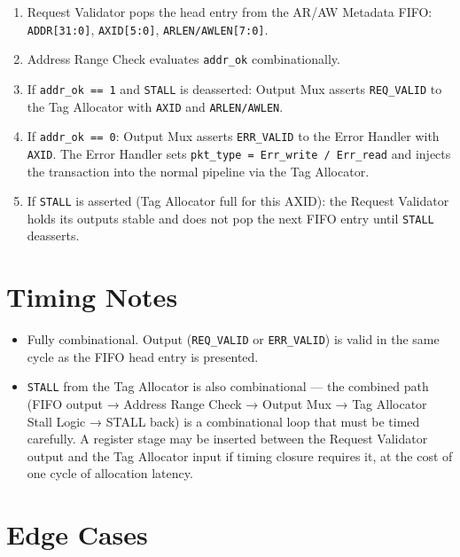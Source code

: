 \documentclass[11pt,a4paper]{article}
\begin{document}
\begin{enumerate}
  \item Request Validator pops the head entry from the AR/AW Metadata
        FIFO: \texttt{ADDR[31:0]}, \texttt{AXID[5:0]},
        \texttt{ARLEN/AWLEN[7:0]}.
  \item Address Range Check evaluates \texttt{addr\_ok} combinationally.
  \item If \texttt{addr\_ok == 1} and \texttt{STALL} is deasserted:
        Output Mux asserts \texttt{REQ\_VALID} to the Tag Allocator
        with \texttt{AXID} and \texttt{ARLEN/AWLEN}.
  \item If \texttt{addr\_ok == 0}: Output Mux asserts \texttt{ERR\_VALID}
        to the Error Handler with \texttt{AXID}. The Error Handler sets
        \texttt{pkt\_type = Err\_write / Err\_read} and injects the
        transaction into the normal pipeline via the Tag Allocator.
  \item If \texttt{STALL} is asserted (Tag Allocator full for this
        AXID): the Request Validator holds its outputs stable and does
        not pop the next FIFO entry until \texttt{STALL} deasserts.
\end{enumerate}

\section{Timing Notes}

\begin{itemize}
  \item Fully combinational. Output (\texttt{REQ\_VALID} or
        \texttt{ERR\_VALID}) is valid in the same cycle as the FIFO
        head entry is presented.
  \item \texttt{STALL} from the Tag Allocator is also combinational —
        the combined path (FIFO output → Address Range Check → Output
        Mux → Tag Allocator Stall Logic → STALL back) is a
        combinational loop that must be timed carefully. A register
        stage may be inserted between the Request Validator output and
        the Tag Allocator input if timing closure requires it, at the
        cost of one cycle of allocation latency.
\end{itemize}

\section{Edge Cases}
\end{document}
